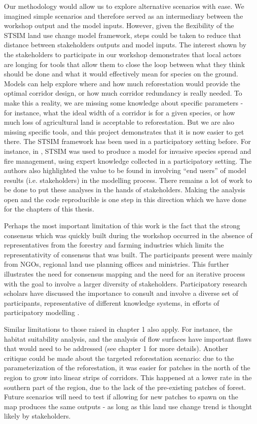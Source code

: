 {Our methodology would allow us to explore alternative scenarios with ease. We imagined simple scenarios and therefore served as an intermediary between the workshop output and the model inputs. However, given the flexibility of the STSIM land use change model framework, steps could be taken to reduce that distance between stakeholders outputs and model inputs. The interest shown by the  stakeholders to participate in our workshop demonstrates that local actors are longing for tools that allow them to close the loop between what they think should be done and what it would effectively mean for species on the ground. Models can help explore where and how much reforestation would provide the optimal corridor design, or how much corridor redundancy is really needed. To make this a reality, we are missing some knowledge about specific parameters - for instance, what the ideal width of a corridor is for a given species, or how much loss of agricultural land is acceptable to reforestation. But we are also missing specific tools, and this project demonstrates that it is now easier to get there. The STSIM framework has been used in a participatory setting before. For instance, in \cite{jarnevich_developing_2019}, STSIM was used to produce a model for invasive species spread and fire management, using expert knowledge collected in a participatory setting. The authors also highlighted the value to be found in involving “end users” of model results (i.e. stakeholders) in the modelling process. There remains a lot of work to be done to put these analyses in the hands of stakeholders. Making the analysis open and the code reproducible is one step in this direction which we have done for the chapters of this thesis.

Perhaps the most important limitation of this work is the fact that the strong consensus which was quickly built during the workshop occurred in the absence of representatives from the forestry and farming industries which limits the representativity of consensus that was built. The participants present were mainly from NGOs, regional land use planning offices and ministries. This further illustrates the need for consensus mapping and the need for an iterative process with the goal to involve a larger diversity of stakeholders. Participatory research scholars have discussed the importance to consult and involve a diverse set of participants, representative of different knowledge systems, in efforts of participatory modelling \cite{gray_modeling_2012}. 

Similar limitations to those raised in chapter 1 also apply. For instance, the habitat suitability analysis, and the analysis of flow surfaces have important flaws that would need to be addressed (see chapter 1 for more details). Another critique could be made about the targeted reforestation scenario: due to the parameterization of the reforestation, it was easier for patches in the north of the region to grow into linear strips of corridors. This happened at a lower rate in the southern part of the region, due to the lack of the pre-existing patches of forest. Future scenarios will need to test if allowing for new patches to spawn on the map produces the same outputs - as long as this land use change trend is thought likely by stakeholders. 

}
